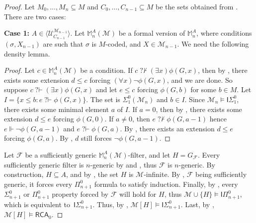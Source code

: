 \documentclass{article}
\def\MM{\mathbb{M}}
\def\F{\mathcal{F}}
\def\U{\mathcal{U}}
\def\M{\mathcal{M}}
\newcommand{\ISig}{\mathsf{I}\Sigma^0}
\newcommand{\IPi}{\mathsf{I}\Pi^0}
\newcommand{\qvdash}{\operatorname{{?}{\vdash}}}
\newcommand{\nqvdash}{\operatorname{{?}{\nvdash}}}
\newcommand{\RCA}{\mathsf{RCA}}
\numberwithin{theorem}{section}
\newtheorem{lemma}[theorem]{Lemma}
\theoremstyle{definition}
\begin{document}
\begin{proof}
Let $M_0, \dots, M_n \subseteq M$ and $C_0, \dots, C_{n-1} \subseteq M$ be the sets obtained from . There are two cases:
\bigskip

\textbf{Case 1:} $A \in \langle \U_{C_{n-1}}^{\M_{n-1}} \rangle$. Let $\MM^A_n(\M)$ be a formal version of $\MM^A_n$, where conditions $(\sigma, X_{n-1})$ are such that $\sigma$ is $M$-coded, and $X \in \M_{n-1}$. We need the following density lemma.

\begin{proof}
Let $c \in \MM^A_n(\M)$ be a condition. If $c \nqvdash (\exists x)\phi(G,x)$, then by , there exists some extension $d \leq c$ forcing $(\forall x) \neg \phi(G,x)$, and we are done. So suppose  $c \qvdash (\exists x)\phi(G,x)$ and let $e \leq c$ forcing $\phi(G,b)$ for some $b \in M$. Let $I = \{ x \leq b : e \qvdash \phi(G, x) \}$. The set is $\Sigma_1^0(\M_n)$ and $b \in I$. Since $\M_n \models \ISig_1$, there exists some minimal element $a$ of $I$. If $a = 0$, then by , there exists some extension $d \leq e$ forcing $\phi(G,0)$. If $a \neq 0$, then $e \nqvdash \phi(G,a-1)$ hence $e \Vdash  \neg \phi(G,a-1)$ and $e \qvdash \phi(G,a)$. By , there exists an extension $d \leq e$ forcing $\phi(G,a)$. By , $d$ still forces $\neg \phi(G,a-1)$.
\end{proof}

Let $\F$ be a sufficiently generic $\MM^A_n(\M)$-filter, and let $H = G_\F$. Every sufficiently generic filter is $n$-generic by  and , thus $\F$ is $n$-generic.
By construction, $H \subseteq A$, and by , the set $H$ is $\M$-infinite.
By , $\F$ being sufficiently generic, it forces every $\Pi_{n+1}^0$ formula to satisfy induction.
Finally, by , every $\Sigma_{n+1}^0$ or $\Pi_{n+1}^0$ property forced by $\F$ will hold for $H$, thus $\M \cup \{H\} \models \IPi_{n+1}$, which is equivalent to~$\ISig_{n+1}$. Thus, by , $\M[H] \models \ISig_{n+1}$. Last, by , $\M[H] \models \RCA_0$.
\bigskip





\end{proof}
\end{document}

